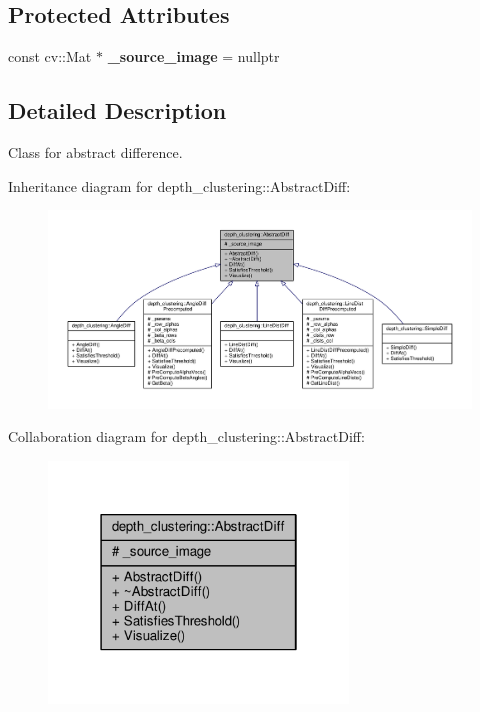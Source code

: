 \subsection*{Protected Attributes}
\begin{DoxyCompactItemize}
\item 
\hypertarget{classdepth__clustering_1_1AbstractDiff_ac554e78b6f29341d1361a8ec6932698a}{const cv\-::\-Mat $\ast$ {\bfseries \-\_\-source\-\_\-image} = nullptr}\label{classdepth__clustering_1_1AbstractDiff_ac554e78b6f29341d1361a8ec6932698a}

\end{DoxyCompactItemize}


\subsection{Detailed Description}
Class for abstract difference. 

Inheritance diagram for depth\-\_\-clustering\-:\-:Abstract\-Diff\-:
\nopagebreak
\begin{figure}[H]
\begin{center}
\leavevmode
\includegraphics[width=350pt]{classdepth__clustering_1_1AbstractDiff__inherit__graph}
\end{center}
\end{figure}


Collaboration diagram for depth\-\_\-clustering\-:\-:Abstract\-Diff\-:
\nopagebreak
\begin{figure}[H]
\begin{center}
\leavevmode
\includegraphics[width=226pt]{classdepth__clustering_1_1AbstractDiff__coll__graph}
\end{center}
\end{figure}


